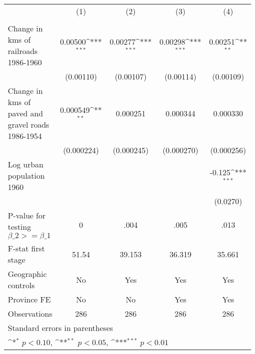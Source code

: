 {
\def\sym#1{\ifmmode^{#1}\else\(^{#1}\)\fi}
\begin{tabular}{l*{4}{c}}
\hline\hline
                &\multicolumn{1}{c}{(1)}&\multicolumn{1}{c}{(2)}&\multicolumn{1}{c}{(3)}&\multicolumn{1}{c}{(4)}\\
                &\multicolumn{1}{c}{}&\multicolumn{1}{c}{}&\multicolumn{1}{c}{}&\multicolumn{1}{c}{}\\
\hline
Change in kms of railroads 1986-1960&  0.00500\sym{***}&  0.00277\sym{***}&  0.00298\sym{***}&  0.00251\sym{**} \\
                &(0.00110)         &(0.00107)         &(0.00114)         &(0.00109)         \\
[1em]
Change in kms of paved and gravel roads 1986-1954& 0.000549\sym{**} & 0.000251         & 0.000344         & 0.000330         \\
                &(0.000224)         &(0.000245)         &(0.000270)         &(0.000256)         \\
[1em]
Log urban population 1960&                  &                  &                  &   -0.125\sym{***}\\
                &                  &                  &                  & (0.0270)         \\
\hline
P-value for testing $\beta\_{2} >= \beta\_{1}$&        0         &     .004         &     .005         &     .013         \\
F-stat first stage&    51.54         &   39.153         &   36.319         &   35.661         \\
Geographic controls&       No         &      Yes         &      Yes         &      Yes         \\
Province FE     &       No         &       No         &      Yes         &      Yes         \\
Observations    &      286         &      286         &      286         &      286         \\
\hline\hline
\multicolumn{5}{l}{\footnotesize Standard errors in parentheses}\\
\multicolumn{5}{l}{\footnotesize \sym{*} \(p<0.10\), \sym{**} \(p<0.05\), \sym{***} \(p<0.01\)}\\
\end{tabular}
}
